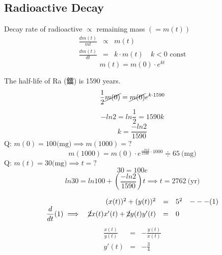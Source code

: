 \subsection*{Radioactive Decay}
Decay rate of radioactive $\propto$ remaining mass $(=m(t))$\\
$$\begin{array}{rcl}
\displaystyle \frac{d m(t)}{mt} & \propto & m(t)\\
\displaystyle \frac{dm(t)}{dt} & = & k \cdot m(t) \quad k<0 \text{ const}
\end{array}$$
$$m(t) = m(0) \cdot e^{kt}$$
\begin{eg}
The half-life of Ra (鐳) is 1590 years. \\
$$\displaystyle \frac{1}{2} \cancel{m(0)} = \cancel{m(0)} e^{k \cdot 1590}$$
$$\displaystyle -ln2 = ln \frac{1}{2} = 1590 k$$
$$\displaystyle k = \frac{-ln2}{1590}$$
Q: $m(0) = 100 \text{(mg)} \implies m(1000)=?$\\
$$\displaystyle m(1000) = m(0) \cdot e^{\frac{-ln2}{1590} \cdot 1000} \Doteq 65 \  \text{(mg)}$$
Q: $m(t) = 30 \text{(mg)} \implies t=?$\\
$$30 = 100 e$$
$$\displaystyle ln 30 = ln 100 + (\frac{-ln2}{1590})t \implies t = 2762 \  \text{(yr)}$$
\end{eg}
\begin{eg}
$$\begin{array}{rrcll}
& (x(t))^2 + (y(t))^2 & = & 5^2 & ---(1)\\
\displaystyle \frac{d}{dt} (1) \implies & \cancel{2}x(t)x'(t) + \cancel{2}y(t)y'(t) & = & 0
\end{array}$$
$$\begin{array}{rcl}
\displaystyle \frac{x(t)}{y(t)} & = & \displaystyle - \frac{y(t)}{x(t)}\\
y'(t) & = & \displaystyle - \frac{3}{4}
\end{array}$$
\end{eg}